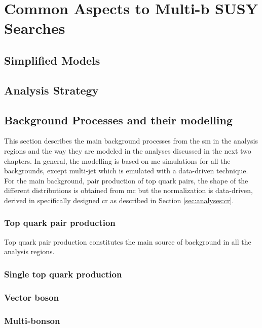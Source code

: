 \chapter{Common Aspects to Multi-b SUSY Searches}
\label{chap:multib_general}

\section{Simplified Models}

\section{Analysis Strategy}

\section{Background Processes and their modelling}

This section describes the main background processes from the \gls{sm} in the analysis regions and the way they are 
modeled in the analyses discussed in the next two chapters. In general, the modelling is based on \gls{mc} simulations for
all the backgrounds, except multi-jet which is emulated with a data-driven technique.
For the main background, pair production of top quark pairs, the shape of the different distributions is obtained from \gls{mc}
but the normalization is data-driven, derived in specifically designed \gls{cr} as described in Section \ref{sec:analyses:cr}.

\subsection{Top quark pair production}

Top quark pair production constitutes the main source of background in all the analysis regions. 

\subsection{Single top quark production}

\subsection{Vector boson}

\subsection{Multi-bonson}


